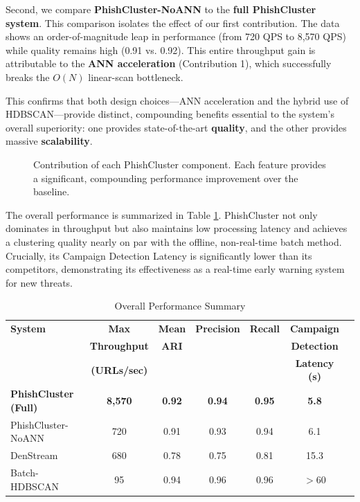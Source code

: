 \documentclass[journal,article,submit,pdftex,moreauthors]{Definitions/mdpi}
\begin{document}
Second, we compare \textbf{PhishCluster-NoANN} to the \textbf{full PhishCluster system}. This comparison isolates the effect of our first contribution. The data shows an order-of-magnitude leap in performance (from 720 QPS to 8,570 QPS) while quality remains high (0.91 vs. 0.92). This entire throughput gain is attributable to the \textbf{ANN acceleration} (Contribution 1), which successfully breaks the $O(N)$ linear-scan bottleneck.

This confirms that both design choices—ANN acceleration and the hybrid use of HDBSCAN—provide distinct, compounding benefits essential to the system's overall superiority: one provides state-of-the-art \textbf{quality}, and the other provides massive \textbf{scalability}.

\begin{figure}[h!]
\centering
{}
\caption{Contribution of each PhishCluster component. Each feature provides a significant, compounding performance improvement over the baseline.}
\label{fig:ablation}
\end{figure}

The overall performance is summarized in Table \ref{tab:summary}. PhishCluster not only dominates in throughput but also maintains low processing latency and achieves a clustering quality nearly on par with the offline, non-real-time batch method. Crucially, its Campaign Detection Latency is significantly lower than its competitors, demonstrating its effectiveness as a real-time early warning system for new threats.

\begin{table}[h!]
\centering
\caption{Overall Performance Summary}
\label{tab:summary}
\begin{tabular}{|l|c|c|c|c|c|c|}
\hline
\textbf{System} & \textbf{Max} &\textbf{Mean} & \textbf{Precision} & \textbf{Recall} & \textbf{Campaign} \\
&\textbf{Throughput}&\textbf{ARI}&&&\textbf{Detection}\\
 & \textbf{(URLs/sec)} & & & & \textbf{Latency (s)} \\
\hline
\textbf{PhishCluster (Full)} & \textbf{8,570} & \textbf{0.92} & \textbf{0.94} & \textbf{0.95} & \textbf{5.8} \\
PhishCluster-NoANN & 720 &  0.91 & 0.93 & 0.94 & 6.1 \\
DenStream & 680 & 0.78 & 0.75 & 0.81 & 15.3 \\
Batch-HDBSCAN & 95 & 0.94 & 0.96 & 0.96 & $> 60$ \\
\hline
\end{tabular}
\end{table}
\end{document}
